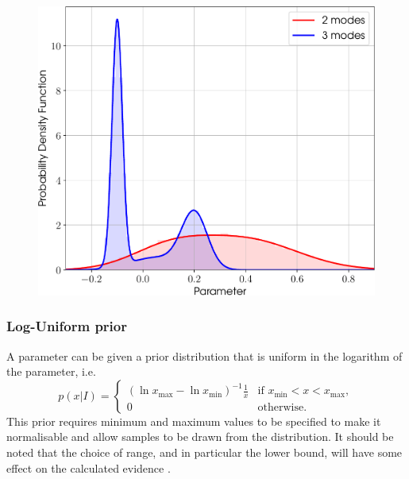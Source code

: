 \begin{figure}[!phtb]
\begin{center}
\includegraphics[width=1\columnwidth]{./figures/priors/gmm/gmm}
\caption{ \protect}
\end{center}
\end{figure}

\subsubsection{Log-Uniform prior}\label{sec:loguniform}

A parameter can be given a prior distribution that is uniform in the logarithm of the parameter, i.e.
\begin{equation}
 p(x|I) = \begin{cases}
             \left(\ln{x_{\text{max}}}-\ln{x_{\text{min}}}\right)^{-1}\frac{1}{x} & \text{if } x_{\text{min}} < x < x_{\text{max}}, \\
             0 & \text{otherwise}.
            \end{cases}
\end{equation}
This prior requires minimum and maximum values to be specified to make it normalisable and allow samples to be drawn from the
distribution. It should be noted that the choice of range, and in particular the lower bound, will have some effect on
the calculated evidence \citep[see, e.g., Appendix~B of][]{MaxCWpolariations}.


